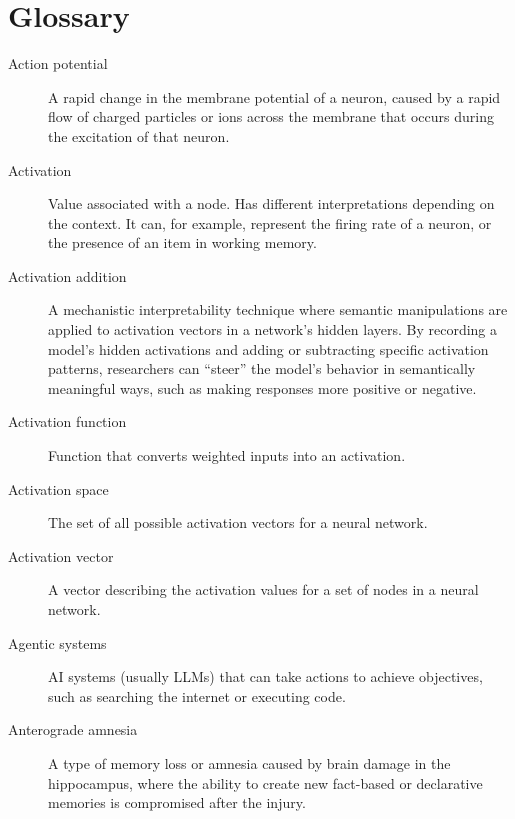 \chapter{Glossary}

\begin{description}

\item[Action potential] A rapid change in the membrane potential of a neuron, caused by a rapid flow of charged particles or ions across the membrane that occurs during the excitation of that neuron.

\item[Activation] Value associated with a node. Has different interpretations depending on the context. It can, for example, represent the firing rate of a neuron, or the presence of an item in working memory.

\item[Activation addition] A mechanistic interpretability technique where semantic manipulations are applied to activation vectors in a network’s hidden layers. By recording a model's hidden activations and adding or subtracting specific activation patterns, researchers can “steer” the model's behavior in semantically meaningful ways, such as making responses more positive or negative.

\item[Activation function] Function that converts weighted inputs into an activation.

\item[Activation space] The set of all possible activation vectors for a neural network.

\item[Activation vector] A vector describing the activation values for a set of nodes in a neural network.
%

\item[Agentic systems] AI systems (usually LLMs) that can take actions to achieve objectives, such as searching the internet or executing code.


\item[Anterograde amnesia] A type of memory loss or amnesia caused by brain damage in the hippocampus, where the ability to create new fact-based or declarative memories is compromised after the injury.


\end{description}
